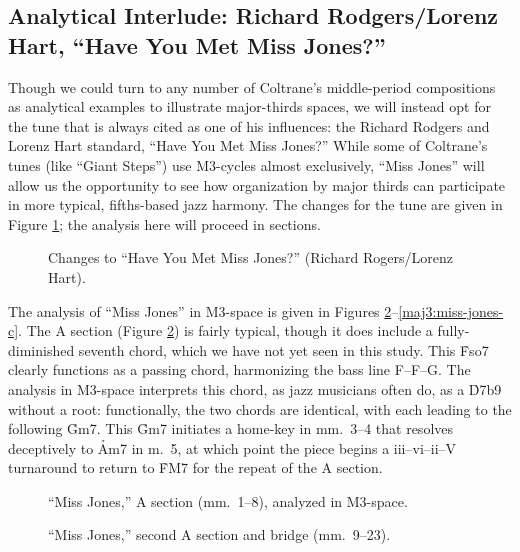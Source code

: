 \subsection{Analytical Interlude: Richard Rodgers/Lorenz Hart, “Have You Met
  Miss Jones?”}
\label{subsec:miss-jones}

Though we could turn to any number of Coltrane's middle-period compositions as
analytical examples to illustrate major-thirds spaces, we will instead opt for
the tune that is always cited as one of his influences: the Richard Rodgers
and Lorenz Hart standard, ``Have You Met Miss Jones?'' While some of
Coltrane's tunes (like ``Giant Steps'') use M3-cycles almost exclusively,
``Miss Jones'' will allow us the opportunity to see how organization by major
thirds can participate in more typical, fifths-based jazz harmony. The changes
for the tune are given in Figure \ref{maj3:miss-jones-changes}; the analysis
here will proceed in sections.

\begin{figure}[tbp]
  \caption{Changes to ``Have You Met Miss Jones?'' (Richard Rogers/Lorenz Hart).}
\label{maj3:miss-jones-changes}
\end{figure}

The analysis of ``Miss Jones'' in M3-space is given in Figures
\ref{maj3:miss-jones-a}--\ref{maj3:miss-jones-c}. The A section (Figure
\ref{maj3:miss-jones-a}) is fairly typical, though it does include a
fully-diminished seventh chord, which we have not yet seen in this study. This
\h{Fso7} clearly functions as a passing chord, harmonizing the bass line
F--F\sharp--G. The analysis in M3-space interprets this chord, as jazz
musicians often do, as a \h{D7b9} without a root: functionally, the two chords
are identical, with each leading to the following \h{Gm7}. This
\h{Gm7} initiates a home-key \tf in mm.~3--4 that resolves deceptively to
\h{Am7} in m.~5, at which point the piece begins a iii--vi--ii--V turnaround
to return to \h{FM7} for the repeat of the A section.

\begin{figure}[tbp]
  \ContinuedFloat
  \caption{``Miss Jones,'' A section (mm.~1--8), analyzed in M3-space.}
\label{maj3:miss-jones-a}
\end{figure}

\begin{figure}[tbp]
  \ContinuedFloat
  \caption{``Miss Jones,'' second A section and bridge (mm.~9--23).}
\label{maj3:miss-jones-b}
\end{figure}

